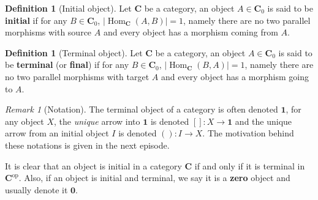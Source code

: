 \documentclass{article}
\theoremstyle{definition}
\newtheorem{defn}[thm]{Definition}
\theoremstyle{remark}
\newtheorem{rem}[thm]{Remark}
\DeclareMathOperator{\Hom}{Hom}
\newcommand{\op}[1]{#1^{\text{op}}}
\begin{document}
\begin{defn}[Initial object]
	Let $\mathbf{C}$ be a category, an object $A \in \mathbf{C}_0$ is said to be \textbf{initial} if for any $B \in \mathbf{C}_0$, $|\Hom_{\mathbf{C}}(A,B)| = 1$, namely there are no two parallel morphisms with source $A$ and every object has a morphism coming from $A$.
\end{defn}
\begin{defn}[Terminal object]
	Let $\mathbf{C}$ be a category, an object $A \in \mathbf{C}_0$ is said to be \textbf{terminal} (or \textbf{final}) if for any $B \in \mathbf{C}_0$, $|\Hom_{\mathbf{C}}(B,A)| = 1$, namely there are no two parallel morphisms with target $A$ and every object has a morphism going to $A$.
\end{defn}
\begin{rem}[Notation]
	The terminal object of a category is often denoted $\mathbf{1}$, for any object $X$, the \textit{unique} arrow into $\mathbf{1}$ is denoted $[]:X \rightarrow \mathbf{1}$ and the unique arrow from an initial object $I$ is denoted $(): I \rightarrow X$. The motivation behind these notations is given in the next episode.
\end{rem}
It is clear that an object is initial in a category $\mathbf{C}$ if and only if it is terminal in $\op{\mathbf{C}}$. Also, if an object is initial and terminal, we say it is a \textbf{zero} object and usually denote it $\mathbf{0}$.
\end{document}
